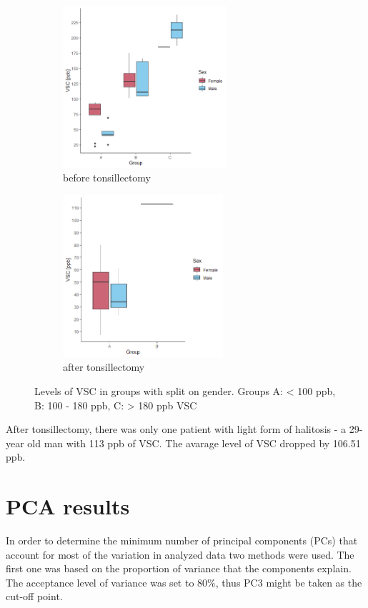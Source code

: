 \documentclass[12pt,a4paper,notitlepage]{report}
\begin{document}
\begin{figure}[h]
 
\begin{subfigure}{0.5\textwidth}
\includegraphics[width=1\linewidth, height=6cm]{./Figures/Fig_3.1a} 
\caption{before tonsillectomy}
\label{Fig_3.1a}
\end{subfigure}
\begin{subfigure}{0.5\textwidth}
\includegraphics[width=1\linewidth, height=6cm]{./Figures/Fig_3.1b}
\caption{after tonsillectomy}
\label{Fig_3.1b}
\end{subfigure}
 
\caption{Levels of VSC in groups with split on gender. Groups A: < 100 ppb,  B: 100 - 180 ppb, C: > 180 ppb VSC}
\label{Fig_3.1}
\end{figure}

After tonsillectomy, there was only one patient with light form of halitosis - a 29-year old man with 113 ppb of VSC.
The avarage level of VSC dropped by 106.51 ppb.

\section{PCA results}


In order to determine the minimum number of principal components (PCs) that account for most of the variation in analyzed data two methods were used. The first one was based on the proportion of variance that the components explain. The acceptance level of variance was set to 80\%, thus PC3 might be taken as the cut-off point.
\end{document}

